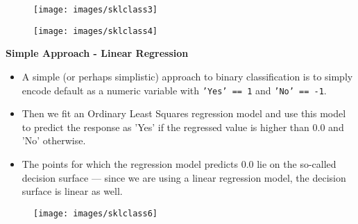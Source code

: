 \documentclass[SKL-MASTER.tex]{subfiles}
\begin{document}

	
	\begin{figure}[h!]
\centering
\texttt{[image: images/sklclass3]}

\end{figure}

	
\newpage
\begin{figure}[h!]
\centering
\texttt{[image: images/sklclass4]}

\end{figure}
	\newpage
\textbf{Simple Approach - Linear Regression}
\begin{itemize}
\item A simple (or perhaps simplistic) approach to binary classification is to simply encode default as a numeric variable with \texttt{'Yes' == 1} and \texttt{'No' == -1}.
\item Then we fit an Ordinary Least Squares regression model and use this model to predict the response as 'Yes' if the regressed value is higher than 0.0 and 'No' otherwise. 
\item The points for which the regression model predicts 0.0 lie on the so-called decision surface — since we are using a linear regression model, the decision surface is linear as well.
\end{itemize}


\begin{figure}[h!]
\centering
\texttt{[image: images/sklclass6]}
\end{figure}
\end{document}
